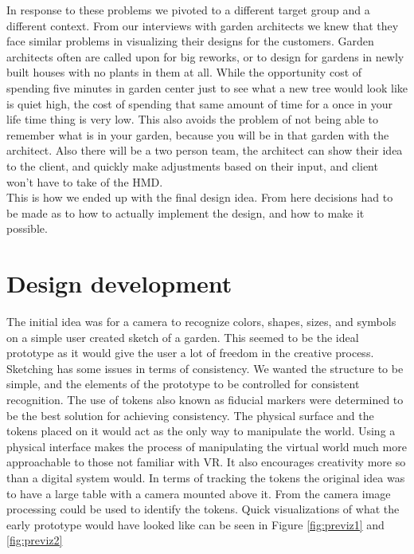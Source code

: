 In response to these problems we pivoted to a different target group and a different context. From our interviews with garden architects we knew that they face similar problems in visualizing their designs for the customers. Garden architects often are called upon for big reworks, or to design for gardens in newly built houses with no plants in them at all. While the opportunity cost of spending five minutes in garden center just to see what a new tree would look like is quiet high, the cost of spending that same amount of time for a once in your life time thing is very low. This also avoids the problem of not being able to remember what is in your garden, because you will be in that garden with the architect. Also there will be a two person team, the architect can show their idea to the client, and quickly make adjustments based on their input, and client won't have to take of the HMD.\\
This is how we ended up with the final design idea. From here decisions had to be made as to how to actually implement the design, and how to make it possible.


\section{Design development}
The initial idea was for a camera to recognize colors, shapes, sizes, and symbols on a simple user created sketch of a garden. This seemed to be the ideal prototype as it would give the user a lot of freedom in the creative process. Sketching has some issues in terms of consistency. We wanted the structure to be simple, and the elements of the prototype to be controlled for consistent recognition. The use of tokens also known as fiducial markers were determined to be the best solution for achieving consistency. The physical surface and the tokens placed on it would act as the only way to manipulate the world. Using a physical interface makes the process of manipulating the virtual world much more approachable to those not familiar with VR. It also encourages creativity more so than a digital system would. In terms of tracking the tokens the original idea was to have a large table with a camera mounted above it. From the camera image processing could be used to identify the tokens. Quick visualizations of what the early prototype would have looked like can be seen in Figure \ref{fig:previz1} and \ref{fig:previz2}


